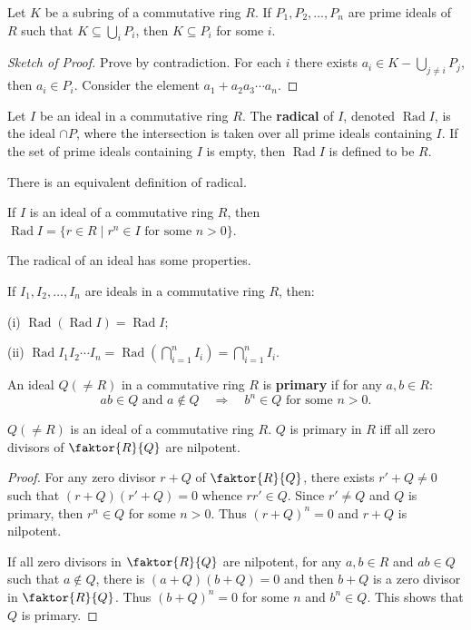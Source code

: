 \documentclass{article}
\DeclareMathOperator{\Rad}{Rad}
\newenvironment{sketch}[1][Sketch of Proof]{\begin{proof}[#1]}{\end{proof}}
\begin{document}
\begin{theorem}
    Let $K$ be a subring of a commutative ring $R$. If $P_1, P_2, \ldots, P_n$ are prime ideals of $R$ such that $K \subseteq \bigcup_i P_i$, then $K \subseteq P_i$ for some $i$.
\end{theorem}
\begin{sketch}
    Prove by contradiction. For each $i$ there exists $a_{i} \in K-\bigcup_{j\neq i}P_j$, then $a_{i} \in P_i$. Consider the element $a_{1}+a_{2}a_{3}\cdots a_{n}$.
\end{sketch}

\begin{definition}
    Let $I$ be an ideal in a commutative ring $R$. The \textbf{radical} of $I$, denoted $\Rad I $, is the ideal $\cap P$, where the intersection is taken over all prime ideals containing $I$. If the set of prime ideals containing $I$ is empty, then $\Rad I$ is defined to be $R$.
\end{definition}

There is an equivalent definition of radical.

\begin{theorem}
    If $I$ is an ideal of a commutative ring $R$, then $\Rad I = \{ r \in R  \mid r^n \in I \text{ for some } n>0 \}$. 
\end{theorem}

The radical of an ideal has some properties.

\begin{proposition}
    If $I_1, I_2, \ldots, I_n$ are ideals in a commutative ring $R$, then:

    (i) $\Rad (\Rad I)=\Rad I$;

    (ii) $\Rad I_{1}I_{2}\cdots I_{n}=\Rad (\bigcap_{i=1}^n I_i )=\bigcap_{i=1}^n I_i$.
\end{proposition}

\begin{definition}
    An ideal $Q(\neq R)$ in a commutative ring $R$ is \textbf{primary} if for any $a,b \in R$:
    \begin{equation*}
        ab \in Q \text{ and } a \notin Q \quad \Rightarrow \quad b^n \in Q \text{ for some } n>0.
    \end{equation*} 
\end{definition}

\begin{theorem}
    $Q(\neq R)$ is an ideal of a commutative ring $R$. $Q$ is primary in $R$ iff all zero divisors of $\faktor{R}{Q}$ are nilpotent.
\end{theorem}
\begin{proof}
    For any zero divisor $r+Q$ of $\faktor{R}{Q}$, there exists $r'+Q\neq 0$ such that $(r+Q)(r'+Q)=0$ whence $rr'\in Q$. Since $r'\neq Q$ and $Q$ is primary, then $r^n \in Q$ for some $n>0$. Thus $(r+Q)^n=0$ and $r+Q$ is nilpotent.

    If all zero divisors in $\faktor{R}{Q}$ are nilpotent, for any $a,b \in R$ and $ab \in Q$ such that $a \notin Q$, there is $(a+Q)(b+Q)=0$ and then $b+Q$ is a zero divisor in $\faktor{R}{Q}$. Thus $(b+Q)^n=0$ for some $n$ and $b^n \in Q$. This shows that $Q$ is primary.
\end{proof}
\end{document}
